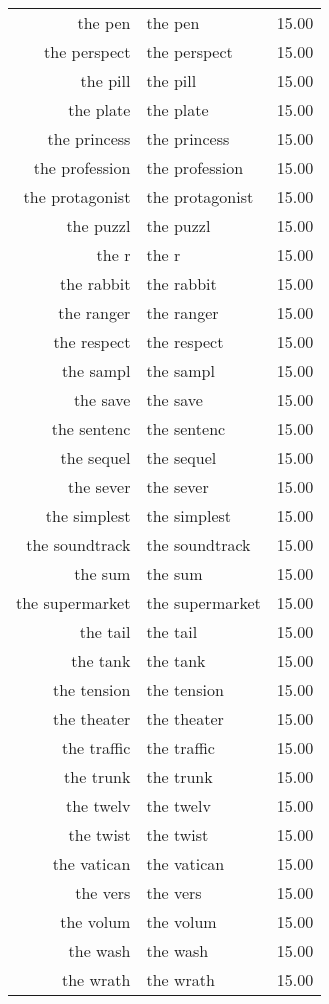 \begin{table}[ht]
\begin{tabular}{rlr}
  the pen & the pen & 15.00 \\ 
  the perspect & the perspect & 15.00 \\ 
  the pill & the pill & 15.00 \\ 
  the plate & the plate & 15.00 \\ 
  the princess & the princess & 15.00 \\ 
  the profession & the profession & 15.00 \\ 
  the protagonist & the protagonist & 15.00 \\ 
  the puzzl & the puzzl & 15.00 \\ 
  the r & the r & 15.00 \\ 
  the rabbit & the rabbit & 15.00 \\ 
  the ranger & the ranger & 15.00 \\ 
  the respect & the respect & 15.00 \\ 
  the sampl & the sampl & 15.00 \\ 
  the save & the save & 15.00 \\ 
  the sentenc & the sentenc & 15.00 \\ 
  the sequel & the sequel & 15.00 \\ 
  the sever & the sever & 15.00 \\ 
  the simplest & the simplest & 15.00 \\ 
  the soundtrack & the soundtrack & 15.00 \\ 
  the sum & the sum & 15.00 \\ 
  the supermarket & the supermarket & 15.00 \\ 
  the tail & the tail & 15.00 \\ 
  the tank & the tank & 15.00 \\ 
  the tension & the tension & 15.00 \\ 
  the theater & the theater & 15.00 \\ 
  the traffic & the traffic & 15.00 \\ 
  the trunk & the trunk & 15.00 \\ 
  the twelv & the twelv & 15.00 \\ 
  the twist & the twist & 15.00 \\ 
  the vatican & the vatican & 15.00 \\ 
  the vers & the vers & 15.00 \\ 
  the volum & the volum & 15.00 \\ 
  the wash & the wash & 15.00 \\ 
  the wrath & the wrath & 15.00 \\ 

\end{tabular}
\end{table}

